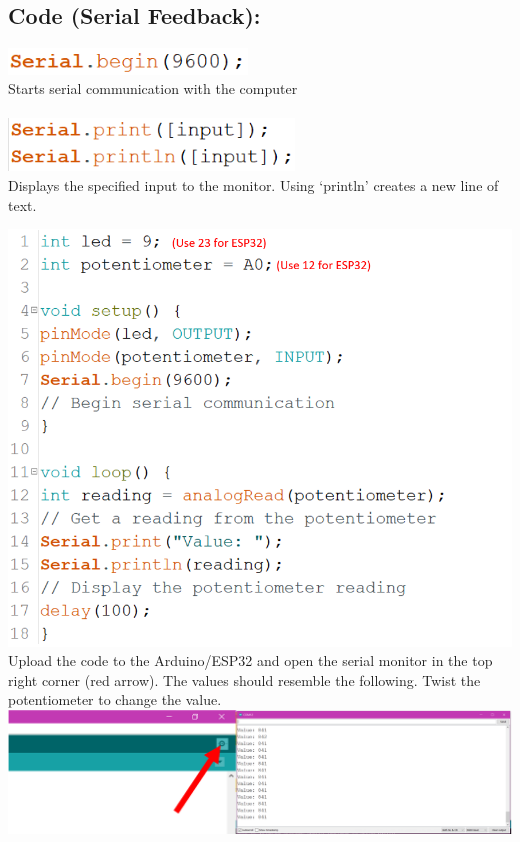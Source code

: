 \documentclass[a4paper,12pt]{report}
\newcommand{\diagramWidth}{150mm}
\newcommand{\codeHeight}{7mm}
\begin{document}
    \subsection*{Code (Serial Feedback):}
        \begin{mdframed}[linewidth = 3, linecolor = turbo_purple]
            \includegraphics[height = \codeHeight]{Assets/begin.png} \\
            Starts serial communication with the computer \\ \\
            \includegraphics[height = 14mm]{Assets/serial.png} \\ 
            Displays the specified input to the monitor. Using ‘println’ creates a new line of text.
        \end{mdframed}

    \newpage
        \includegraphics[width = \diagramWidth]{Assets/serial_code.png} \\
        Upload the code to the Arduino/ESP32 and open the serial monitor in the top right corner (red arrow). The values should resemble the following. Twist the potentiometer to change the value. \\
        \includegraphics[width = \diagramWidth]{Assets/serial_monitor.png}
\end{document}
